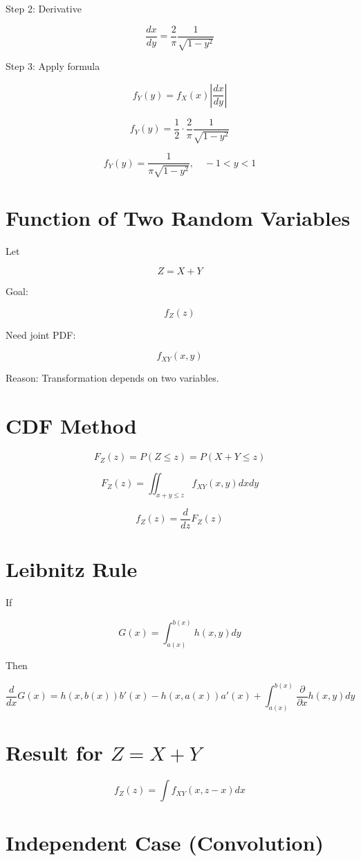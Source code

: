 \documentclass[12pt]{article}
\begin{document}
Step 2: Derivative

\[
\frac{dx}{dy}
=
\frac{2}{\pi}
\frac{1}{\sqrt{1-y^2}}
\]

Step 3: Apply formula

\[
f_Y(y)
=
f_X(x)
\left|\frac{dx}{dy}\right|
\]

\[
f_Y(y)
=
\frac12
\cdot
\frac{2}{\pi}
\frac{1}{\sqrt{1-y^2}}
\]

\[
f_Y(y)
=
\frac{1}{\pi \sqrt{1-y^2}},
\quad -1<y<1
\]

\section{Function of Two Random Variables}

Let

\[
Z = X + Y
\]

Goal:

\[
f_Z(z)
\]

Need joint PDF:

\[
f_{XY}(x,y)
\]

Reason:
Transformation depends on two variables.

\section{CDF Method}

\[
F_Z(z)
=
P(Z \le z)
=
P(X + Y \le z)
\]

\[
F_Z(z)
=
\iint_{x+y \le z}
f_{XY}(x,y) dx dy
\]

\[
f_Z(z)
=
\frac{d}{dz} F_Z(z)
\]

\section{Leibnitz Rule}

If

\[
G(x)
=
\int_{a(x)}^{b(x)} h(x,y) dy
\]

Then

\[
\frac{d}{dx} G(x)
=
h(x,b(x)) b'(x)
-
h(x,a(x)) a'(x)
+
\int_{a(x)}^{b(x)}
\frac{\partial}{\partial x} h(x,y) dy
\]

\section{Result for $Z = X + Y$}

\[
f_Z(z)
=
\int
f_{XY}(x, z-x)
dx
\]

\section{Independent Case (Convolution)}
\end{document}
